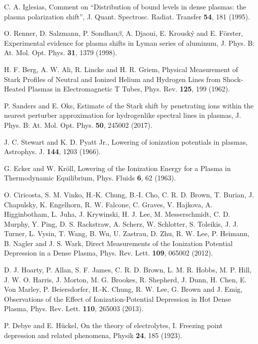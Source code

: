 \documentclass[a4paper,10pt]{article}
\begin{document}
\begin{thebibliography}{99}
C. A. Iglesias, Comment on ``Distribution of bound levels in dense plasmas: the plasma polarization shift'', J. Quant. Spectrosc. Radiat. Transfer {\bf 54}, 181 (1995).

O. Renner, D. Salzmann, P. Sondhau$\beta$, A. Djaoui, E. Krousk\'y and E. F\"orster, Experimental evidence for plasma shifts in Lyman series of aluminum, J. Phys. B: At. Mol. Opt. Phys. {\bf 31}, 1379 (1998).

H. F. Berg, A. W. Ali, R. Lincke and H. R. Griem, Physical Measurement of Stark Profiles of Neutral and Ionized Helium and Hydrogen Lines from Shock-Heated Plasmas in Electromagnetic T Tubes, Phys. Rev. {\bf 125}, 199 (1962).

P. Sanders and E. Oks, Estimate of the Stark shift by penetrating ions within the nearest perturber approximation for hydrogenlike spectral lines in plasmas, J. Phys. B: At. Mol. Opt. Phys. {\bf 50}, 245002 (2017).

J. C. Stewart and K. D. Pyatt Jr., Lowering of ionization potentials in plasmas, Astrophys. J. {\bf 144}, 1203 (1966).

G. Ecker and W. Kr\"oll, Lowering of the Ionization Energy for a Plasma in Thermodynamic Equilibrium, Phys. Fluids {\bf 6}, 62 (1963).

O. Ciricosta, S. M. Vinko, H.-K. Chung, B.-I. Cho, C. R. D. Brown, T. Burian, J. Chapulsky, K. Engelhorn, R. W. Falcone, C. Graves, V. Hajkova, A. Higginbotham, L. Juha, J. Krywinski, H. J. Lee, M. Messerschmidt, C. D. Murphy, Y. Ping, D. S. Rackstraw, A. Scherz, W. Schlotter, S. Toleikis, J. J. Turner, L. Vysin, T. Wang, B. Wu, U. Zastrau, D. Zhu, R. W. Lee, P. Heimann, B. Nagler and J. S. Wark, Direct Measurements of the Ionization Potential Depression in a Dense Plasma, Phys. Rev. Lett. {\bf 109}, 065002 (2012).

D. J. Hoarty, P. Allan, S. F. James, C. R. D. Brown, L. M. R. Hobbs, M. P. Hill, J. W. O. Harris, J. Morton, M. G. Brookes, R. Shepherd, J. Dunn, H. Chen, E. Von Marley, P. Beiersdorfer, H.-K. Chung, R. W. Lee, G. Brown and J. Emig, Observations of the Effect of Ionization-Potential Depression in Hot Dense Plasma, Phys. Rev. Lett. {\bf 110}, 265003 (2013).

P. Debye and E. H\"uckel, On the theory of electrolytes, I. Freezing point depression and related phenomena, Physik {\bf 24}, 185 (1923). 


\end{thebibliography}
\end{document}
